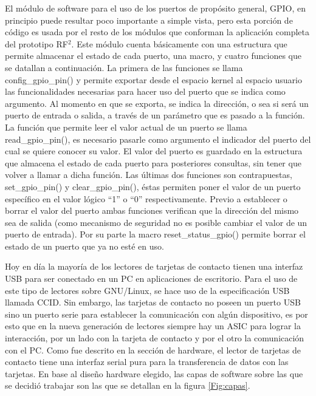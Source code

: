 \bigskip
El módulo de software para el uso de los puertos de propósito general, GPIO, en principio puede resultar poco importante a simple vista, pero esta porción de código es usada por el resto de los módulos que conforman la aplicación completa del prototipo RF$^{2}$. 
Este módulo cuenta básicamente con una estructura que permite almacenar el estado de cada puerto, una macro, y cuatro funciones que se datallan a continuación.
La primera de las funciones se llama config\_gpio\_pin() y permite exportar desde el espacio kernel al espacio usuario las funcionalidades necesarias para hacer uso del puerto que se indica como argumento. Al momento en que se exporta, se indica la dirección, o sea si será un puerto de entrada o salida, a través de un parámetro que es pasado a la función.
La función que permite leer el valor actual de un puerto se llama read\_gpio\_pin(), es necesario pasarle como argumento el indicador del puerto del cual se quiere conocer su valor. El valor del puerto es guardado en la estructura que almacena el estado de cada puerto para posteriores consultas, sin tener que volver a llamar a dicha función.
Las últimas dos funciones son contrapuestas, set\_gpio\_pin() y clear\_gpio\_pin(), éstas permiten poner el valor de un puerto específico en el valor lógico “1” o “0” respectivamente. Previo a establecer o borrar el valor del puerto ambas funciones verifican que la dirección del mismo sea de salida (como mecanismo de seguridad no es posible cambiar el valor de un puerto de entrada).
Por su parte la macro reset\_status\_gpio() permite borrar el estado de un puerto que ya no esté en uso.


\bigskip
{}

Hoy en día la mayoría de los lectores de tarjetas de contacto tienen una interfaz USB para ser conectado en un PC en aplicaciones de escritorio. Para el uso de este tipo de lectores sobre GNU/Linux, se hace uso de la especificación USB llamada CCID.
Sin embargo, las tarjetas de contacto no poseen un puerto USB sino un puerto serie para establecer la comunicación con algún dispositivo, es por esto que en la nueva generación de lectores siempre hay un  ASIC para lograr la interacción, por un lado con la tarjeta de contacto y por el otro la comunicación con el PC.
Como fue descrito en la sección de hardware, el lector de tarjetas de contacto tiene una interfaz serial pura para la transferencia de datos con las tarjetas. En base al diseño hardware elegido, las capas de software sobre las que se decidió trabajar son las que se detallan en la figura \ref{Fig:capas}. 

